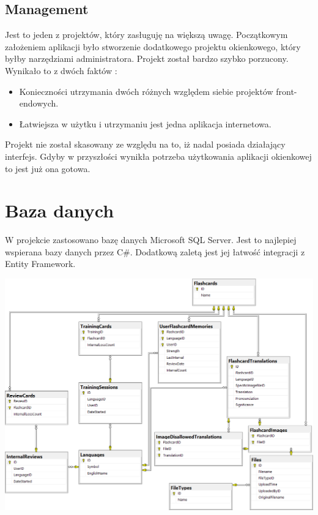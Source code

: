 \subsection{Management}

Jest to jeden z projektów, który zasługuję na większą uwagę. Początkowym założeniem aplikacji było stworzenie dodatkowego projektu okienkowego, który byłby narzędziami administratora. Projekt został bardzo szybko porzucony. Wynikało to z dwóch faktów :
\begin{itemize}
\setlength\itemsep{1mm}
	\item Konieczności utrzymania dwóch różnych względem siebie projektów front-endowych.
	\item Łatwiejsza w użytku  i utrzymaniu jest jedna aplikacja internetowa.
\end{itemize}
Projekt nie został skasowany ze względu na to, iż nadal posiada działający interfejs. Gdyby w przyszłości wynikła potrzeba użytkowania aplikacji okienkowej to jest już ona gotowa.




\section{Baza danych}

W projekcie zastosowano bazę danych Microsoft SQL Server. Jest to najlepiej wspierana bazy danych przez C\#. Dodatkową zaletą jest jej łatwość integracji z Entity Framework.
\begin{landscape}
\begin{center}
  \includegraphics[width=\textwidth]{images/erd.png}
\end{center}
\end{landscape}


